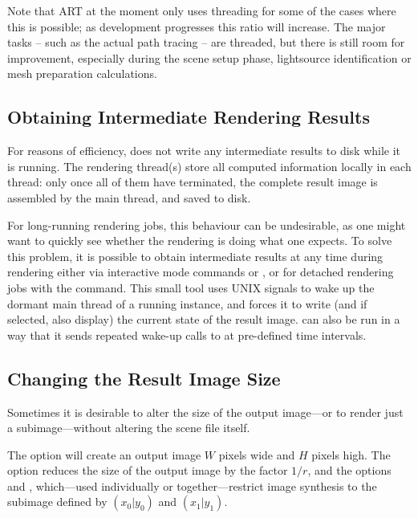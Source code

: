 Note that ART at the moment only uses threading for some of the cases
where this is possible; as development progresses this ratio will
increase. The major tasks -- such as the actual path tracing -- are threaded, but there is still room for improvement,
especially during the scene setup phase, \eg lightsource
identification or mesh preparation calculations.

\subsection{Obtaining Intermediate Rendering Results}
For reasons of efficiency,  does not write any intermediate results to disk while it is running. The rendering thread(s) store all computed information locally in each thread: only once all of them have terminated, the complete result image is assembled by the main thread, and saved to disk. 

For long-running rendering jobs, this behaviour can be undesirable, as one might want to quickly see whether the rendering is doing what one expects. To solve this problem, it is possible to obtain intermediate results at any time during rendering either via interactive mode commands  or , or for detached rendering jobs with the  command. This small tool uses UNIX signals to wake up the dormant main thread of a running  instance, and forces it to write (and if selected, also display) the current state of the result image.  can also be run in a way that it sends repeated wake-up calls to  at pre-defined time intervals.

\subsection{Changing the Result Image Size}
\label{sec:using:imageSize}
Sometimes it is desirable to alter the size of the output image---or
to render just a subimage---without altering the scene file itself.

The option  will create an output image $W$ pixels
wide and $H$ pixels high.  The option  reduces the
size of the output image by the factor $1/r$, and the options
 and , which---used individually or
together---restrict image synthesis to the subimage defined by
$(x_0|y_0)$ and $(x_1|y_1)$.  

